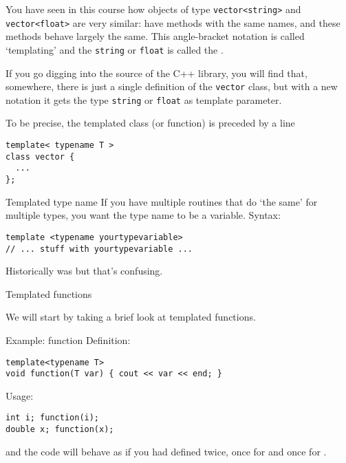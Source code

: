 
You have seen in this course how
objects of type \lstinline+vector<string>+ and \lstinline+vector<float>+
are very similar:
have methods with the same names,
and these methods behave largely the same.
This angle-bracket notation is called `templating' and the
\lstinline+string+ or \lstinline+float+ is called the
.

If you go digging into the source of the C++ library,
you will find that, somewhere,
there is just a single definition of the \lstinline+vector+ class,
but with a new notation it gets the type \lstinline+string+ or \lstinline+float+
as template parameter.

To be precise, the templated class (or function)
is preceded by a line
\begin{lstlisting}
template< typename T >
class vector {
  ...
};
\end{lstlisting}

\begin{block}{Templated type name}
  \label{sl:template-gen}
  If you have multiple routines that do `the same' for multiple types,
  you want the type name to be a variable. Syntax:
\begin{lstlisting}
template <typename yourtypevariable>
// ... stuff with yourtypevariable ...
\end{lstlisting}
\end{block}

Historically  was  but that's confusing.

 {Templated functions}

We will start by taking a brief look at
templated functions.

\begin{block}{Example: function}
  \label{sl:template-fun}
  Definition:
\begin{lstlisting}
template<typename T>
void function(T var) { cout << var << end; }
\end{lstlisting}
Usage:
\begin{lstlisting}
int i; function(i);
double x; function(x);
\end{lstlisting}
and the code will behave as if you had defined  twice,
once for  and once for .
\end{block}

